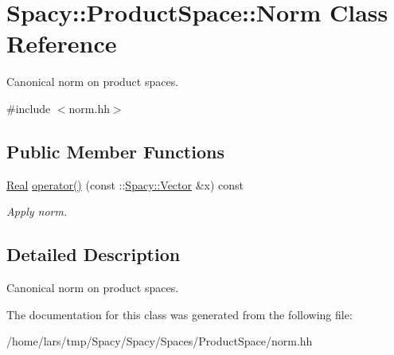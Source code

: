 \hypertarget{classSpacy_1_1ProductSpace_1_1Norm}{}\section{Spacy\+:\+:Product\+Space\+:\+:Norm Class Reference}
\label{classSpacy_1_1ProductSpace_1_1Norm}


Canonical norm on product spaces.  




{\ttfamily \#include $<$norm.\+hh$>$}

\subsection*{Public Member Functions}
\begin{DoxyCompactItemize}
\item 
\hyperlink{classSpacy_1_1Real}{Real} \hyperlink{classSpacy_1_1ProductSpace_1_1Norm_a2c5b998ea93fdfb5e3c0df5f436bbe05}{operator()} (const \+::\hyperlink{classSpacy_1_1Vector}{Spacy\+::\+Vector} \&x) const \hypertarget{classSpacy_1_1ProductSpace_1_1Norm_a2c5b998ea93fdfb5e3c0df5f436bbe05}{}\label{classSpacy_1_1ProductSpace_1_1Norm_a2c5b998ea93fdfb5e3c0df5f436bbe05}

\begin{DoxyCompactList}\small\item\em Apply norm. \end{DoxyCompactList}\end{DoxyCompactItemize}


\subsection{Detailed Description}
Canonical norm on product spaces. 

The documentation for this class was generated from the following file\+:\begin{DoxyCompactItemize}
\item 
/home/lars/tmp/\+Spacy/\+Spacy/\+Spaces/\+Product\+Space/norm.\+hh\end{DoxyCompactItemize}
